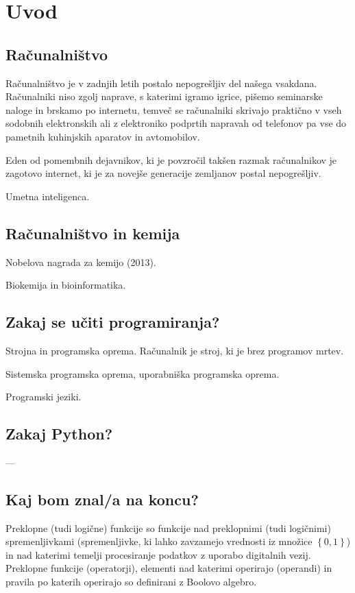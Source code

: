 \chapter{Uvod}

\section{Računalništvo}

Računalništvo je v zadnjih letih postalo nepogrešljiv del našega vsakdana. Računalniki niso zgolj naprave, s katerimi igramo igrice, pišemo seminarske naloge in brskamo po internetu, temveč se računalniki skrivajo praktično v vseh sodobnih elektronskih ali z elektroniko podprtih napravah od telefonov pa vse do pametnih kuhinjskih aparatov in avtomobilov. 

Eden od pomembnih dejavnikov, ki je povzročil takšen razmak računalnikov je zagotovo internet, ki je za novejše generacije zemljanov postal nepogrešljiv. 

Umetna inteligenca.

\section{Računalništvo in kemija}

Nobelova nagrada za kemijo (2013).

Biokemija in bioinformatika.

\section{Zakaj se učiti programiranja?}

Strojna in programska oprema. Računalnik je stroj, ki je brez programov mrtev. 

Sistemska programska oprema, uporabniška programska oprema. 

Programski jeziki.


\section{Zakaj Python?}
---
\section{Kaj bom znal/a na koncu?} 


Preklopne (tudi logične) funkcije so funkcije nad preklopnimi (tudi logičnimi) spremenljivkami (spremenljivke, ki lahko zavzamejo vrednosti iz množice $\left\{0, 1\right\}$) in nad katerimi temelji procesiranje podatkov z uporabo digitalnih vezij. Preklopne funkcije (operatorji), elementi nad katerimi operirajo (operandi) in pravila po katerih operirajo so definirani z Boolovo algebro.

